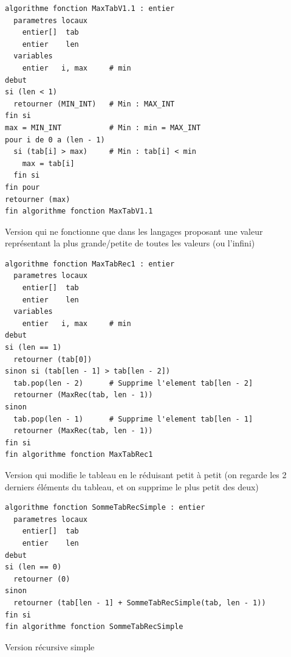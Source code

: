 \documentclass[11pt,a4paper]{article}
\begin{document}
\clearpage

\begin{table}[ht!]
  \centering
\begin{lstlisting}[style=algorithmique]
algorithme fonction MaxTabV1.1 : entier
  parametres locaux
    entier[]  tab
    entier    len
  variables
    entier   i, max     # min
debut
si (len < 1)
  retourner (MIN_INT)   # Min : MAX_INT
fin si
max = MIN_INT           # Min : min = MAX_INT
pour i de 0 a (len - 1)
  si (tab[i] > max)     # Min : tab[i] < min
    max = tab[i]
  fin si
fin pour
retourner (max)
fin algorithme fonction MaxTabV1.1 \end{lstlisting}
  \caption{Version qui ne fonctionne que dans les langages proposant une valeur représentant la plus grande/petite de toutes les valeurs (ou l'infini)}
\end{table}


\begin{table}[ht!]
  \centering
\begin{lstlisting}[style=algorithmique]
algorithme fonction MaxTabRec1 : entier
  parametres locaux
    entier[]  tab
    entier    len
  variables
    entier   i, max     # min
debut
si (len == 1)
  retourner (tab[0])
sinon si (tab[len - 1] > tab[len - 2])
  tab.pop(len - 2)      # Supprime l'element tab[len - 2]
  retourner (MaxRec(tab, len - 1))
sinon
  tab.pop(len - 1)      # Supprime l'element tab[len - 1]
  retourner (MaxRec(tab, len - 1))
fin si
fin algorithme fonction MaxTabRec1 \end{lstlisting}
  \caption{Version qui modifie le tableau en le réduisant petit à petit (on regarde les 2 derniers éléments du tableau, et on supprime le plus petit des deux)}
\end{table}





\newpage


\begin{table}[ht!]
  \centering
\begin{lstlisting}[style=algorithmique]
algorithme fonction SommeTabRecSimple : entier
  parametres locaux
    entier[]  tab
    entier    len
debut
si (len == 0)
  retourner (0)
sinon
  retourner (tab[len - 1] + SommeTabRecSimple(tab, len - 1))
fin si
fin algorithme fonction SommeTabRecSimple \end{lstlisting}
  \caption{Version récursive simple}
\end{table}
\end{document}
